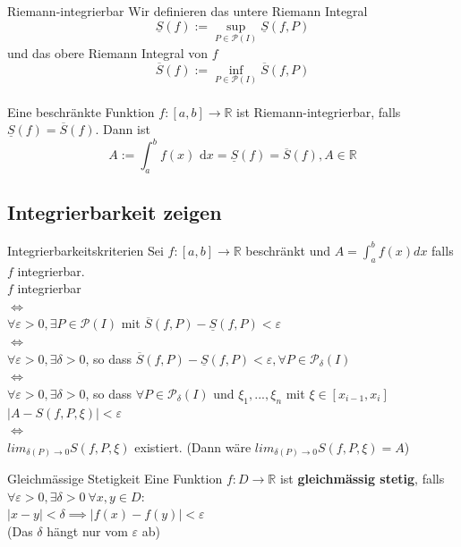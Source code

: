 \documentclass[a4paper,fontsize = 7pt]{scrartcl}
\def\limn{\lim_{n\to \infty}}
\def\R{\mathbb{R}}
\def\dx{\text{ d}x}
\begin{document}
\begin{mainbox}{Riemann-integrierbar}
  \vspace{-4pt}
  Wir definieren das untere Riemann Integral 
  $$\underline{S}(f):= \sup_{P \in \mathcal{P}(I)} \underline{S}(f, P)$$   
  und das obere Riemann Integral von $f$ 
  $$\overline{S}(f) := \inf_{P \in \mathcal{P}(I)} \overline{S}(f, P)$$
 \\Eine beschränkte Funktion $f:[a,b] \to \R$ ist Riemann-integrierbar, falls $\underline{S}(f) = \overline{S}(f)$. Dann ist 
 $$A := \int_a^b f(x)\dx = \underline{S}(f) = \overline{S}(f), A \in \R$$%
 \vspace{-12pt}
\end{mainbox}

\subsection{Integrierbarkeit zeigen}

\begin{mainbox}{Integrierbarkeitskriterien}
  \vspace{-4pt}
  Sei $f: [a, b] \to \R$ beschränkt und $A = \int_{a}^{b} f(x)dx$ falls $f$ integrierbar.
  \\$f$ integrierbar 
  \\$\iff$\\
  $\forall \varepsilon > 0, \exists P \in \mathcal{P}(I)$ mit $\overline{S}(f, P) - \underline{S}(f, P) < \varepsilon$
  \\$\iff$\\ 
  $\forall \varepsilon > 0, \exists \delta > 0$, so dass $\overline{S}(f, P) - \underline{S}(f, P) < \varepsilon, \forall P \in \mathcal{P}_{\delta}(I)$ 
  \\$\iff$\\
  $\forall \varepsilon > 0, \exists \delta > 0$, so dass $\forall P \in \mathcal{P}_{\delta}(I)$ und $\xi_1, ...,\xi_n$ mit $\xi \in [x_{i-1},x_i]$
  \\$|A - S(f, P, \xi)| < \varepsilon$ 
  \\$\iff$\\
  $lim_{\delta(P) \to 0} S(f, P, \xi)$ existiert. 
  (Dann wäre $lim_{\delta(P) \to 0} S(f, P, \xi) = A$)
  \vspace{-4pt}
\end{mainbox}

\begin{subbox}{Gleichmässige Stetigkeit}
  \vspace{-4pt}
  Eine Funktion $f: D \to \R$ ist \textbf{gleichmässig stetig}, falls $\forall \varepsilon > 0, \exists \delta > 0 \ \forall x, y \in D:$
  \\$|x - y| < \delta \implies |f(x) - f(y)| < \varepsilon$
  \\(Das $\delta$ hängt nur vom $\varepsilon$ ab)
  \vspace{-4pt}
\end{subbox}
\end{document}
